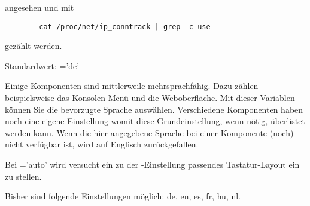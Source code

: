 \begin{description}
    angesehen und mit

    \begin{example}
      \begin{verbatim}
        cat /proc/net/ip_conntrack | grep -c use
      \end{verbatim}
    \end{example}

    gezählt werden.



  Standardwert: ='de'

  Einige Komponenten sind mittlerweile mehrsprachfähig. Dazu zählen
  beispielsweise das Konsolen-Menü und die Weboberfläche. Mit dieser Variablen
  können Sie die bevorzugte Sprache auswählen. Verschiedene Komponenten haben
  noch eine eigene Einstellung womit diese Grundeinstellung, wenn nötig,
  überlistet werden kann. Wenn die hier angegebene Sprache bei einer Komponente
  (noch) nicht verfügbar ist, wird auf Englisch zurückgefallen.

  Bei ='auto' wird versucht ein zu der
  -Einstellung passendes Tastatur-Layout ein zu stellen.

  Bisher sind folgende Einstellungen möglich: de, en, es, fr, hu, nl.  

\end{description}
